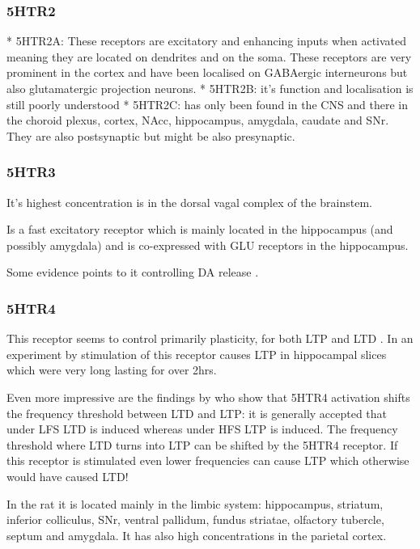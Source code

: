 \documentclass[12pt,a4paper]{article}
\begin{document}
\subsubsection{5HTR2}

  * 5HTR2A: These receptors are excitatory and enhancing inputs when activated meaning they are located on dendrites and on the soma. These receptors are very prominent in the cortex and have been localised on GABAergic interneurons but also glutamatergic projection neurons.
  * 5HTR2B: it's function and localisation is still poorly understood
  * 5HTR2C: has only been found in the CNS and there in the choroid plexus, cortex, NAcc, hippocampus, amygdala, caudate and SNr. They are also postsynaptic but might be also presynaptic.

\subsubsection{5HTR3}

It's highest concentration is in the dorsal vagal complex of the brainstem. 

Is a fast excitatory receptor which is mainly located in the hippocampus (and possibly amygdala) \citep{Palacios1990} and is co-expressed with GLU receptors in the hippocampus.

Some evidence points to it controlling DA release \citep{Mengod2010}.

\subsubsection{5HTR4}

This receptor seems to control primarily plasticity, for both LTP and LTD \citep{Penas-Cazorla2015}. In an experiment by \citep{Mlinar2006} stimulation of this receptor causes LTP in hippocampal slices which were very long lasting for over 2hrs.

Even more impressive are the findings by \citep{Hagena2017} who show that 5HTR4 activation shifts the frequency threshold between LTD and LTP: it is generally accepted that under LFS LTD is induced whereas under HFS LTP is induced. The frequency threshold where LTD turns into LTP can be shifted by the 5HTR4 receptor. If this receptor is stimulated even lower frequencies can cause LTP which otherwise would have caused LTD!

In the rat it is located mainly in the limbic system: hippocampus, striatum, inferior colliculus, SNr, ventral pallidum, fundus striatae, olfactory tubercle, septum and amygdala. It has also high concentrations in the parietal cortex.
\end{document}
